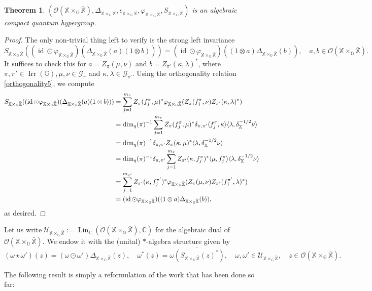 \documentclass[reqno]{amsart}
\numberwithin{equation}{section}
\newtheorem{Theorem}{Theorem}[section]
\newcommand\XGX{\X\times_\G \bar{\X}}
\DeclareMathOperator{\id}{\mathrm{id}}
\DeclareMathOperator{\Irr}{\mathrm{Irr}}
\newcommand{\mcG}{\mathcal{G}}
\newcommand{\mcO}{\mathcal{O}}
\newcommand{\C}{\mathbb{C}}
\newcommand{\G}{\mathbb{G}}
\newcommand{\X}{\mathbb{X}}
\begin{document}
\begin{Theorem}\label{hypergroup}
    $(\mcO(\XGX), \Delta_{\XGX}, \epsilon_{\XGX}, \varphi_{\XGX}, S_{\XGX})$ is an algebraic compact quantum hypergroup.
\end{Theorem}
\begin{proof} The only non-trivial thing left to verify is the strong left invariance
$$S_{\XGX}((\id \odot \varphi_{\XGX})(\Delta_{\XGX}(a)(1\otimes b))) = (\id \odot \varphi_{\XGX})((1\otimes a)\Delta_{\XGX}(b)), \quad a,b \in \mcO(\XGX).$$ It suffices to check this for $a= Z_\pi(\mu, \nu)$ and $b= Z_{\pi'}(\kappa, \lambda)^*$, where $\pi, \pi' \in \Irr(\G), \mu, \nu \in \mcG_\pi$ and $\kappa, \lambda \in \mcG_{\pi'}$. Using the orthogonality relation \eqref{orthogonality5}, we compute
\begin{align*}
    S_{\XGX}((\id \odot \varphi_{\XGX})(\Delta_{\XGX}(a)(1\otimes b))) &= \sum_{j=1}^{m_\pi} Z_\pi(f_j^\pi, \mu)^* \varphi_{\XGX} (Z_\pi(f_j^\pi, \nu)Z_{\pi'}(\kappa, \lambda)^*)\\
    &= \dim_q(\pi)^{-1}\sum_{j=1}^{m_\pi} Z_\pi(f_j^\pi, \mu)^* \delta_{\pi, \pi'} \langle f_j^\pi, \kappa\rangle \langle \lambda, \delta_\X^{-1/2}\nu\rangle\\
    &= \dim_q(\pi)^{-1} \delta_{\pi, \pi'} Z_\pi(\kappa, \mu)^* \langle \lambda, \delta_\X^{-1/2}\nu\rangle\\
    &=  \dim_q(\pi)^{-1} \delta_{\pi, \pi'} \sum_{j=1}^{m_\pi} Z_{\pi'}(\kappa, f_j^\pi)^*\langle \mu, f_j^\pi\rangle\langle \lambda, \delta_\X^{-1/2} \nu\rangle\\
    \vspace{-1.0mm}&= \sum_{j=1}^{m_{\pi'}} Z_{\pi'}(\kappa, f_j^{\pi'})^* \varphi_{\XGX}(Z_\pi(\mu, \nu)Z_{\pi'}(f_j^{\pi'},\lambda)^*)\\
    &= (\id \odot \varphi_{\XGX})((1\otimes a)\Delta_{\XGX}(b)),
\end{align*}
as desired.
\end{proof}

 Let us write $\mathscr{U}_{\XGX}:= \operatorname{Lin}_\C(\mcO(\XGX), \C)$ for the algebraic dual of $\mcO(\XGX)$. We endow it with the (unital) $*$-algebra structure given by
$$(\omega \star \omega')(z)= (\omega \odot \omega')\Delta_{\XGX}(z), \quad \omega^*(z)= \overline{\omega(S_{\XGX}(z)^*)}, \quad \omega, \omega'\in \mathscr{U}_{\XGX}, \quad z \in \mcO(\XGX).$$



The following result is simply a reformulation of the work that has been done so far:
\end{document}
